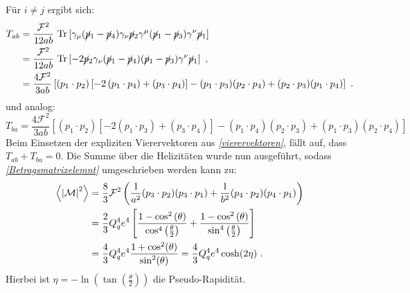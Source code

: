 Für $i \neq j$ ergibt sich:
\begin{equation}
\begin{aligned}
T_{ab} &= \frac{\mathcal{F}^2}{12ab}~\text{Tr}\left[\gamma_\mu(\cancel{p}_1- \cancel{p}_4)  \gamma_\nu \cancel{p}_2 \gamma^\mu (\cancel{p}_1- \cancel{p}_3)  \gamma^\nu \cancel{p}_1 \right] \\
&=\frac{\mathcal{F}^2}{12ab}~\text{Tr}\left[ -2 \cancel{p}_2 \gamma_\nu (\cancel{p}_1- \cancel{p}_4)   (\cancel{p}_1- \cancel{p}_3)  \gamma^\nu \cancel{p}_1 \right]~, \\
&=  \frac{4\mathcal{F}^2}{3ab} \left[\left( p_1\cdot p_2\right) \left[ -2 \left( p_1 \cdot p_4 \right) + \left(p_3 \cdot p_4\right)\right] - (p_1\cdot p_3)(p_2\cdot p_4) + (p_2\cdot p_3)(p_1\cdot p_4)\right]~.
\end{aligned}
\end{equation}
und analog:
\begin{equation}
T_{ba} = \frac{4\mathcal{F}^2}{3ab} \left[\left( p_1\cdot p_2\right) \left[ -2 \left( p_1 \cdot p_3 \right) + \left(p_3 \cdot p_4\right)\right] - (p_1\cdot p_4)(p_2\cdot p_3) + (p_1\cdot p_3)(p_2\cdot p_4)\right]
\end{equation}
Beim Einsetzen der expliziten Vierervektoren aus \textit{\autoref{vierervektoren}}, fällt auf, dass $T_{ab} + T_{ba} = 0$. Die Summe über die Helizitäten wurde nun ausgeführt, sodass \textit{\autoref{Betragsmatrixelemnt}} umgeschrieben werden kann zu:
\begin{equation}
\begin{aligned}
\left\langle  \abs{\mathcal{M}}^2\right\rangle &= \frac{8}{3}\mathcal{F}^2 \left(\frac{1}{a^2}(p_3\cdot p_2)(p_3\cdot p_1) + \frac{1}{b^2} (p_4\cdot p_2)(p_4\cdot p_1) \right) \\
&= \frac{2}{3}Q_q^4e^4\left[\frac{1-\cos^2\left(\theta\right)}{\cos^4\left(\frac{\theta}{2}\right)} + \frac{1-\cos^2\left(\theta\right)}{\sin^4\left(\frac{\theta}{2}\right)}\right] \\
&=\frac{4}{3} Q_q^4e^4\frac{1+\cos^2(\theta)}{\sin^2(\theta)} = \frac{4}{3} Q_q^4e^4\cosh(2\eta)~.
\end{aligned}
\end{equation}
Hierbei ist  $\eta = -\ln\left(\tan\left(\frac{\theta}{2}\right)\right)$ die Pseudo-Rapidität.
